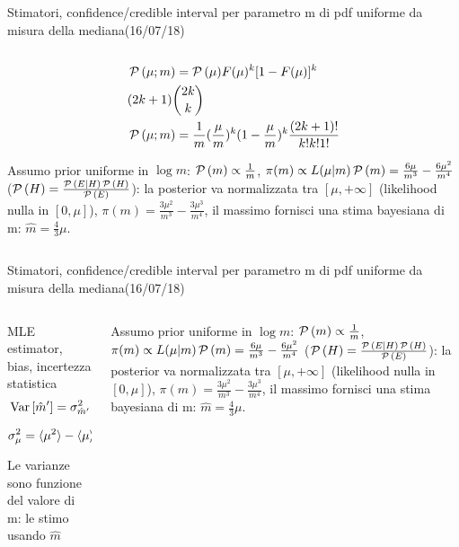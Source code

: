 \begin{wordonframe}{Stimatori, confidence/credible interval per parametro m di pdf uniforme da misura della mediana(16/07/18)}
\begin{columns}[T]
\begin{column}{0.5\textwidth}
\begin{align*}
&\operatorname{\mathcal{P}}{(\mu;m)}=\operatorname{\mathcal{P}}{(\mu)}F(\mu)^k[1-F(\mu)]^k\\
&(2k+1)\binom{2k}{k}\\
&\operatorname{\mathcal{P}}{(\mu;m)}=\frac{1}{m}(\frac{\mu}{m})^k(1-\frac{\mu}{m})^k\frac{(2k+1)!}{k!k!1!}
\end{align*}
\vspace{5cm}
\begin{block}{}
Assumo prior uniforme in $\log{m}$: $\operatorname{\mathcal{P}}{(m)}\propto\frac{1}{m}$,  $\pi(m)\propto L(\mu|m)\operatorname{\mathcal{P}}{(m)}=\frac{6\mu}{m^3}-\frac{6\mu^2}{m^4}$ ($\operatorname{\mathcal{P}}{(H)}=\frac{\operatorname{\mathcal{P}}{(E|H)\operatorname{\mathcal{P}}{(H)}}}{\operatorname{\mathcal{P}}{(E)}}$): la posterior va normalizzata tra $[\mu,+\infty]$ (likelihood nulla  in $[0,\mu]$), $\pi(m)=\frac{3\mu^2}{m^3}-\frac{3\mu^3}{m^4}$, il massimo fornisci una stima bayesiana di m: $\hat{m}=\frac{4}{3}\mu$.
\end{block}
\end{column}\end{columns}
\end{wordonframe}

\begin{wordonframe}{Stimatori, confidence/credible interval per parametro m di pdf uniforme da misura della mediana(16/07/18)}
	\begin{columns}[T]\begin{column}{0.5\textwidth}
			\begin{block}{MLE estimator, bias, incertezza statistica}
				\begin{align*}
				&\operatorname{Var}{[\hat{m}']}=\sigma^2_{\hat{m}'}=4\operatorname{Var}{\mu}=4\sigma_{\mu}^2\\
				&\sigma^2_{\mu}=\langle \mu^2 \rangle-\langle \mu \rangle^2=\frac{m^2}{20}
				\end{align*}
				Le varianze sono funzione del valore di m: le stimo usando $\hat{m}$
			\end{block}
		\end{column}\begin{column}{0.5\textwidth}
			\begin{block}{}
				Assumo prior uniforme in $\log{m}$: $\operatorname{\mathcal{P}}{(m)}\propto\frac{1}{m}$,  $\pi(m)\propto L(\mu|m)\operatorname{\mathcal{P}}{(m)}=\frac{6\mu}{m^3}-\frac{6\mu^2}{m^4}$ ($\operatorname{\mathcal{P}}{(H)}=\frac{\operatorname{\mathcal{P}}{(E|H)\operatorname{\mathcal{P}}{(H)}}}{\operatorname{\mathcal{P}}{(E)}}$): la posterior va normalizzata tra $[\mu,+\infty]$ (likelihood nulla  in $[0,\mu]$), $\pi(m)=\frac{3\mu^2}{m^3}-\frac{3\mu^3}{m^4}$, il massimo fornisci una stima bayesiana di m: $\hat{m}=\frac{4}{3}\mu$.
			\end{block}
	\end{column}\end{columns}
\end{wordonframe}

